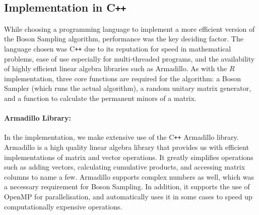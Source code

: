 \documentclass[11pt]{article}
\theoremstyle{theorem}
\theoremstyle{theorem}
\theoremstyle{remark}
\theoremstyle{note}
\theoremstyle{plain}
\theoremstyle{definition}
\begin{document}
\subsection{Implementation in C\texttt{++}}
While choosing a programming language to implement a more efficient version of the Boson Sampling algorithm, performance was the key deciding factor. The language chosen was C\texttt{++} due to its reputation for speed in mathematical problems, ease of use especially for multi-threaded programs, and the availability of highly efficient linear algebra libraries such as Armadillo. As with the $R$ implementation, three core functions are required for the algorithm: a Boson Sampler (which runs the actual algorithm), a random unitary matrix generator, and a function to calculate the permanent minors of a matrix.

\paragraph{Armadillo Library:} In the implementation, we make extensive use of the C\texttt{++} Armadillo library\cite{armadillo}. Armadillo is a high quality linear algebra library that provides us with efficient implementations of matrix and vector operations. It greatly simplifies operations such as adding vectors, calculating cumulative products, and accessing matrix columns to name a few. Armadillo supports complex numbers as well, which was a necessary requirement for Boson Sampling. In addition, it supports the use of OpenMP for parallelisation, and automatically uses it in some cases to speed up computationally expensive operations.
\end{document}
